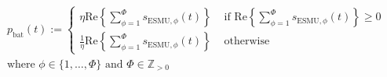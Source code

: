 \begin{equation}
\begin{split}
	p_\text{bat}(t) := 
	\begin{cases}
		\eta\text{Re}\left\{\sum_{\phi=1}^{\Phi}s_{\text{ESMU},\phi}(t)\right\} &\text{ if } \text{Re}\left\{\sum_{\phi=1}^{\Phi}s_{\text{ESMU},\phi}(t)\right\} \geq 0\\
		\frac{1}{\eta}\text{Re}\left\{\sum_{\phi=1}^{\Phi}s_{\text{ESMU},\phi}(t)\right\} &\text{ otherwise}
	\end{cases}\\
	\text{where } \phi \in \{1, \dots, \Phi\} \text{ and } \Phi \in \mathbb{Z}_{>0}
\end{split}
\label{ch1:equ:battery-power-definition}
\end{equation}